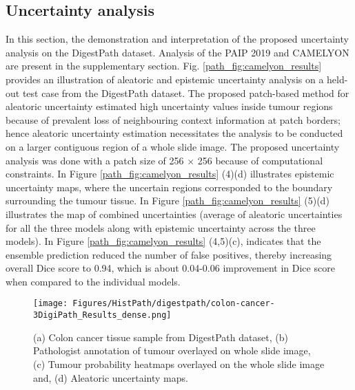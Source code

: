 \documentclass[times,twocolumn,final,authoryear]{tmp}
\begin{document}
\subsection{Uncertainty analysis}
In this section, the demonstration and interpretation of the proposed uncertainty analysis on the DigestPath dataset. Analysis of the PAIP 2019 and CAMELYON are present in the supplementary section. Fig. \ref{path_fig:camelyon_results} provides an illustration of aleatoric and epistemic uncertainty analysis on a held-out test case from the DigestPath dataset. The proposed patch-based method for aleatoric uncertainty estimated high uncertainty values inside tumour regions because of prevalent loss of neighbouring context information at patch borders; hence aleatoric uncertainty estimation necessitates the analysis to be conducted on a larger contiguous region of a whole slide image. The proposed uncertainty analysis was done with a patch size of 256 $\times$ 256 because of computational constraints. In Figure \ref{path_fig:camelyon_results} (4)(d) illustrates epistemic uncertainty maps, where the uncertain regions corresponded to the boundary surrounding the tumour tissue. In Figure \ref{path_fig:camelyon_results} (5)(d) illustrates the map of combined uncertainties (average of aleatoric uncertainties for all the three models along with epistemic uncertainty across the three models). In Figure \ref{path_fig:camelyon_results} (4,5)(c), indicates that the ensemble prediction reduced the number of false positives, thereby increasing overall Dice score to 0.94, which is about 0.04-0.06 improvement in Dice score when compared to the individual models.

\begin{figure}
    \texttt{[image: Figures/HistPath/digestpath/colon-cancer-3DigiPath\_Results\_dense.png]}
    \caption{(a) Colon cancer tissue sample from DigestPath dataset, (b) Pathologist annotation of tumour overlayed on whole slide image, (c) Tumour probability heatmaps overlayed on the whole slide image and, (d) Aleatoric uncertainty maps.}
    \label{path_fig:digestpath_results}
\end{figure}
\end{document}
